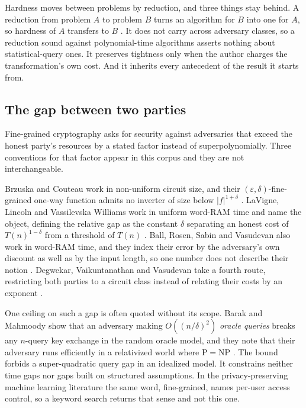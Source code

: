 Hardness moves between problems by reduction, and three things stay behind. A
reduction from problem $A$ to problem $B$ turns an algorithm for $B$ into one
for $A$, so hardness of $A$ transfers to $B$ \cite{BB20}. It does not carry
across adversary classes, so a reduction sound against polynomial-time
algorithms asserts nothing about statistical-query ones. It preserves tightness
only when the author charges the transformation's own cost. And it inherits
every antecedent of the result it starts from.

\subsection{The gap between two parties}

Fine-grained cryptography asks for security against adversaries that exceed the
honest party's resources by a stated factor instead of superpolynomially. Three
conventions for that factor appear in this corpus and they are not
interchangeable.

Brzuska and Couteau work in non-uniform circuit size, and their
$(\varepsilon,\delta)$-fine-grained one-way function admits no inverter of size
below $|f|^{1+\delta}$ \cite{BC22}. LaVigne, Lincoln and Vassilevska Williams
work in uniform word-RAM time and name the object, defining the relative gap as
the constant $\delta$ separating an honest cost of $T(n)^{1-\delta}$ from a
threshold of $T(n)$ \cite{LLW19}. Ball, Rosen, Sabin and Vasudevan also work in
word-RAM time, and they index their error by the adversary's own discount as
well as by the input length, so one number does not describe their notion
\cite{BRSV17}. Degwekar, Vaikuntanathan and Vasudevan take a fourth route,
restricting both parties to a circuit class instead of relating their costs by
an exponent \cite{DVV16}.

One ceiling on such a gap is often quoted without its scope. Barak and Mahmoody
show that an adversary making $O((n/\delta)^2)$ \emph{oracle queries} breaks any
$n$-query key exchange in the random oracle model, and they note that their
adversary runs efficiently in a relativized world where $\mathrm{P} =
\mathrm{NP}$ \cite{BM09}. The bound forbids a super-quadratic query gap in an
idealized model. It constrains neither time gaps nor gaps built on structured
assumptions. In the privacy-preserving machine learning literature the same
word, fine-grained, names per-user access control, so a keyword search returns
that sense and not this one.
